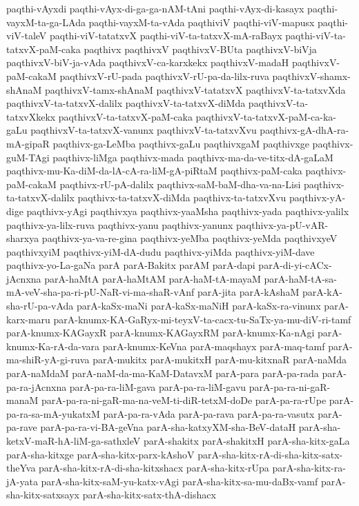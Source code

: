 {paqthi-vAyxdi
paqthi-vAyx-di-ga-ga-nAM-tAni
paqthi-vAyx-di-kasayx
paqthi-vayxM-ta-ga-LAda
paqthi-vayxM-ta-vAda
paqthiviV
paqthi-viV-mapusx
paqthi-viV-taleV
paqthi-viV-tatatxvX
paqthi-viV-ta-tatxvX-mA-raBayx
paqthi-viV-ta-tatxvX-paM-caka
paqthivx
paqthivxV
paqthivxV-BUta
paqthivxV-biVja
paqthivxV-biV-ja-vAda
paqthivxV-ca-karxkekx
paqthivxV-madaH
paqthivxV-paM-cakaM
paqthivxV-rU-pada
paqthivxV-rU-pa-da-lilx-ruva
paqthivxV-shamx-shAnaM
paqthivxV-tamx-shAnaM
paqthivxV-tatatxvX
paqthivxV-ta-tatxvXda
paqthivxV-ta-tatxvX-dalilx
paqthivxV-ta-tatxvX-diMda
paqthivxV-ta-tatxvXkekx
paqthivxV-ta-tatxvX-paM-caka
paqthivxV-ta-tatxvX-paM-ca-ka-gaLu
paqthivxV-ta-tatxvX-vanunx
paqthivxV-ta-tatxvXvu
paqthivx-gA-dhA-ra-mA-gipaR
paqthivx-ga-LeMba
paqthivx-gaLu
paqthivxgaM
paqthivxge
paqthivx-guM-TAgi
paqthivx-liMga
paqthivx-mada
paqthivx-ma-da-ve-titx-dA-gaLaM
paqthivx-mu-Ka-diM-da-lA-cA-ra-liM-gA-piRtaM
paqthivx-paM-caka
paqthivx-paM-cakaM
paqthivx-rU-pA-dalilx
paqthivx-saM-baM-dha-va-na-Lisi
paqthivx-ta-tatxvX-dalilx
paqthivx-ta-tatxvX-diMda
paqthivx-ta-tatxvXvu
paqthivx-yA-dige
paqthivx-yAgi
paqthivxya
paqthivx-yaaMsha
paqthivx-yada
paqthivx-yalilx
paqthivx-ya-lilx-ruva
paqthivx-yanu
paqthivx-yanunx
paqthivx-ya-pU-vAR-sharxya
paqthivx-ya-va-re-gina
paqthivx-yeMba
paqthivx-yeMda
paqthivxyeV
paqthivxyiM
paqthivx-yiM-dA-dudu
paqthivx-yiMda
paqthivx-yiM-dave
paqthivx-yo-La-gaNa
parA
parA-Bakitx
parAM
parA-dapi
parA-di-yi-cACx-jAcnxna
parA-haMtA
parA-haMtAM
parA-haM-tA-mayaM
parA-haM-tA-sa-mA-veV-sha-pa-ri-pU-NaR-vi-ma-shaR-vAnf
parA-jita
parA-kAshaM
parA-kA-sha-rU-pa-vAda
parA-kaSx-maNi
parA-kaSx-maNiH
parA-kaSx-ra-vinunx
parA-karx-maru
parA-knumx-KA-GaRyx-mi-teyxV-ta-cacx-tu-SaTx-ya-mu-diV-ri-tamf
parA-knumx-KAGayxR
parA-knumx-KAGayxRM
parA-knumx-Ka-nAgi
parA-knumx-Ka-rA-da-vara
parA-knumx-KeVna
parA-maqshayx
parA-maq-tamf
parA-ma-shiR-yA-gi-ruva
parA-mukitx
parA-mukitxH
parA-mu-kitxnaR
parA-naMda
parA-naMdaM
parA-naM-da-ma-KaM-DatavxM
parA-para
parA-pa-rada
parA-pa-ra-jAcnxna
parA-pa-ra-liM-gava
parA-pa-ra-liM-gavu
parA-pa-ra-ni-gaR-manaM
parA-pa-ra-ni-gaR-ma-na-veM-ti-diR-tetxM-doDe
parA-pa-ra-rUpe
parA-pa-ra-sa-mA-yukatxM
parA-pa-ra-vAda
parA-pa-rava
parA-pa-ra-vasutx
parA-pa-rave
parA-pa-ra-vi-BA-geVna
parA-sha-katxyXM-sha-BeV-dataH
parA-sha-ketxV-maR-hA-liM-ga-sathxleV
parA-shakitx
parA-shakitxH
parA-sha-kitx-gaLa
parA-sha-kitxge
parA-sha-kitx-parx-kAshoV
parA-sha-kitx-rA-di-sha-kitx-satx-theYva
parA-sha-kitx-rA-di-sha-kitxshacx
parA-sha-kitx-rUpa
parA-sha-kitx-ra-jA-yata
parA-sha-kitx-saM-yu-katx-vAgi
parA-sha-kitx-sa-mu-daBx-vamf
parA-sha-kitx-satxsayx
parA-sha-kitx-satx-thA-dishacx
}

